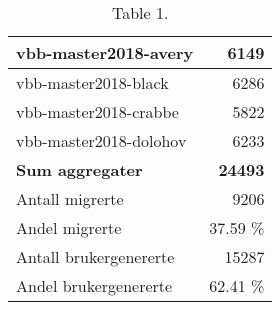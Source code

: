 \begin{table}[hbtp]
  \begin{center}
    \begin{tabular}{ | l | r |}
      \hline
      vbb-master2018-avery & 6149 \\ \hline
      vbb-master2018-black & 6286 \\ \hline
      vbb-master2018-crabbe & 5822 \\ \hline
      vbb-master2018-dolohov & 6233 \\ \hline
      \textbf{Sum aggregater} & \textbf{24493} \\ \hline
      Antall migrerte & 9206 \\ \hline
      Andel migrerte & 37.59 \% \\ \hline
      Antall brukergenererte & 15287 \\ \hline
      Andel brukergenererte & 62.41 \% \\ \hline
    \end{tabular}
  \end{center}
  \caption{Table 1.}
  \label{backend2}
\end{table}
